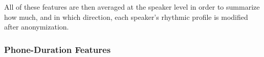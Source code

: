 \documentclass[12pt,leqno,a4paper]{article}
\begin{document}
All of these features are then averaged at the speaker level in order to summarize how much, and in which direction, each speaker's rhythmic profile is modified after anonymization.

\subsubsection{Phone-Duration Features}
\label{subsec:phone_duration_features}







\end{document}

